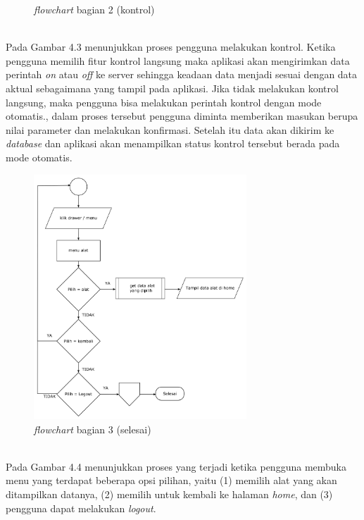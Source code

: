 \begin{flushleft}
\begin{justify}
\begin{enumerate}[label=\alph*.]
\begin{figure}[ht]
                \caption{\textit{flowchart} bagian 2 (kontrol)}
            \end{figure}
            \\Pada Gambar 4.3 menunjukkan proses pengguna melakukan kontrol. Ketika pengguna memilih fitur kontrol langsung maka aplikasi akan mengirimkan data perintah \emph{on} atau \emph{off}
            ke server sehingga keadaan data menjadi sesuai dengan data aktual sebagaimana yang tampil pada aplikasi. 
            Jika tidak melakukan kontrol langsung, maka pengguna bisa melakukan perintah kontrol dengan mode otomatis., dalam proses tersebut pengguna diminta memberikan masukan berupa nilai parameter dan melakukan konfirmasi. Setelah itu data akan dikirim ke \emph{database} dan aplikasi akan menampilkan status kontrol tersebut berada pada mode otomatis.
            \begin{figure}[ht]
                \centering
                \includegraphics[width=8cm]{images/bab 4/fc-pilih alat.png}
                \caption{\textit{flowchart} bagian 3 (selesai)}
            \end{figure}
            \\Pada Gambar 4.4 menunjukkan proses yang terjadi ketika pengguna membuka menu yang terdapat beberapa opsi pilihan, yaitu (1) memilih alat yang akan ditampilkan datanya, (2) memilih untuk kembali ke halaman \emph{home}, dan (3) pengguna dapat melakukan \emph{logout}.
           

\end{enumerate}
\end{justify}
\end{flushleft}
